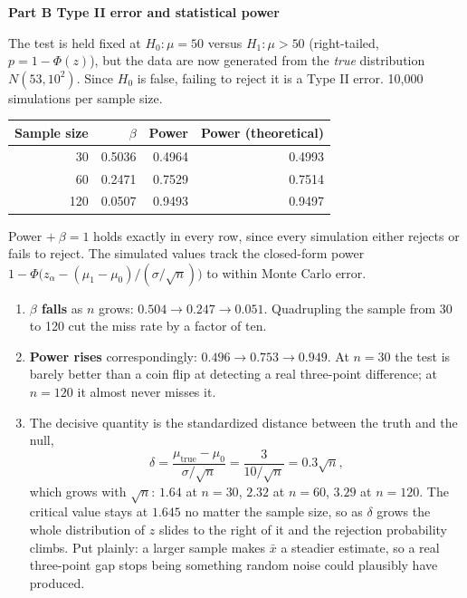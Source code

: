 \documentclass[11pt]{article}
\begin{document}
\vspace{6pt}
\noindent\textbf{Part B \quad Type II error and statistical power}

\smallskip
\noindent The test is held fixed at $H_0:\mu=50$ versus $H_1:\mu>50$ (right-tailed,
$p=1-\Phi(z)$), but the data are now generated from the \emph{true} distribution $N(53,10^2)$. Since
$H_0$ is false, failing to reject it is a Type II error. 10,000 simulations per sample size.

\begin{center}\small
\begin{tabular}{rrrr}
\toprule
Sample size & $\beta$ & Power & Power (theoretical)\\
\midrule
30  & 0.5036 & 0.4964 & 0.4993\\
60  & 0.2471 & 0.7529 & 0.7514\\
120 & 0.0507 & 0.9493 & 0.9497\\
\bottomrule
\end{tabular}
\end{center}

\noindent Power $+\ \beta=1$ holds exactly in every row, since every simulation either rejects or
fails to reject. The simulated values track the closed-form power
$1-\Phi\!\big(z_\alpha-(\mu_1-\mu_0)/(\sigma/\sqrt n)\big)$ to within Monte Carlo error.

\begin{enumerate}[label=\textbf{(\alph*)},leftmargin=*,itemsep=4pt]
\item \textbf{$\beta$ falls} as $n$ grows: $0.504\to0.247\to0.051$. Quadrupling the sample from 30
to 120 cut the miss rate by a factor of ten.
\item \textbf{Power rises} correspondingly: $0.496\to0.753\to0.949$. At $n=30$ the test is barely
better than a coin flip at detecting a real three-point difference; at $n=120$ it almost never
misses it.
\item The decisive quantity is the standardized distance between the truth and the null,
\[ \delta=\frac{\mu_{\text{true}}-\mu_0}{\sigma/\sqrt n}=\frac{3}{10/\sqrt n}=0.3\sqrt n, \]
which grows with $\sqrt n$: $1.64$ at $n=30$, $2.32$ at $n=60$, $3.29$ at $n=120$. The critical
value stays at $1.645$ no matter the sample size, so as $\delta$ grows the whole distribution of
$z$ slides to the right of it and the rejection probability climbs. Put plainly: a larger sample
makes $\bar x$ a steadier estimate, so a real three-point gap stops being something random noise
could plausibly have produced.
\end{enumerate}
\end{document}
